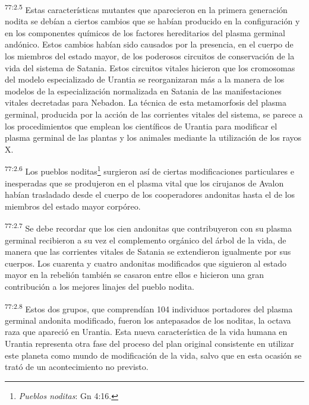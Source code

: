 \par
\textsuperscript{77:2.5} Estas características mutantes que aparecieron en la primera generación nodita se debían a ciertos cambios que se habían producido en la configuración y en los componentes químicos de los factores hereditarios del plasma germinal andónico. Estos cambios habían sido causados por la presencia, en el cuerpo de los miembros del estado mayor, de los poderosos circuitos de conservación de la vida del sistema de Satania. Estos circuitos vitales hicieron que los cromosomas del modelo especializado de Urantia se reorganizaran más a la manera de los modelos de la especialización normalizada en Satania de las manifestaciones vitales decretadas para Nebadon. La técnica de esta metamorfosis del plasma germinal, producida por la acción de las corrientes vitales del sistema, se parece a los procedimientos que emplean los científicos de Urantia para modificar el plasma germinal de las plantas y los animales mediante la utilización de los rayos X.

\par
\textsuperscript{77:2.6} Los pueblos noditas\footnote{\textit{Pueblos noditas}: Gn 4:16.} surgieron así de ciertas modificaciones particulares e inesperadas que se produjeron en el plasma vital que los cirujanos de Avalon habían trasladado desde el cuerpo de los cooperadores andonitas hasta el de los miembros del estado mayor corpóreo.

\par
\textsuperscript{77:2.7} Se debe recordar que los cien andonitas que contribuyeron con su plasma germinal recibieron a su vez el complemento orgánico del árbol de la vida, de manera que las corrientes vitales de Satania se extendieron igualmente por sus cuerpos. Los cuarenta y cuatro andonitas modificados que siguieron al estado mayor en la rebelión también se casaron entre ellos e hicieron una gran contribución a los mejores linajes del pueblo nodita.

\par
\textsuperscript{77:2.8} Estos dos grupos, que comprendían 104 individuos portadores del plasma germinal andonita modificado, fueron los antepasados de los noditas, la octava raza que apareció en Urantia. Esta nueva característica de la vida humana en Urantia representa otra fase del proceso del plan original consistente en utilizar este planeta como mundo de modificación de la vida, salvo que en esta ocasión se trató de un acontecimiento no previsto.

